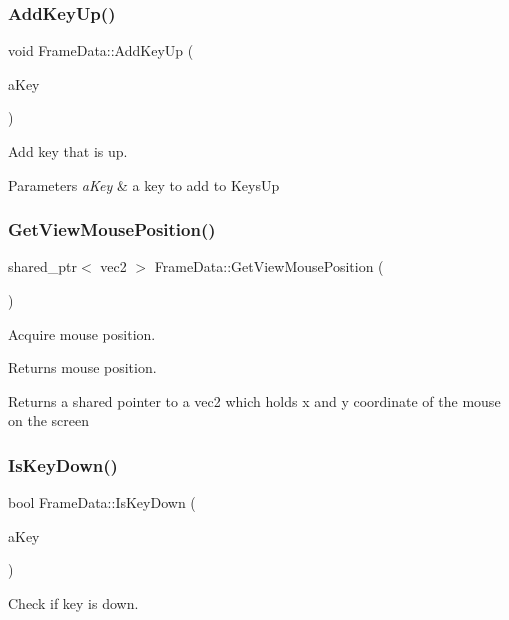 \subsubsection{AddKeyUp()}
{\footnotesize\ttfamily void Frame\+Data\+::\+Add\+Key\+Up (\begin{DoxyParamCaption}\item[{S\+D\+L\+\_\+\+Keycode}]{a\+Key }\end{DoxyParamCaption})}



Add key that is up. 


\begin{DoxyParams}{Parameters}
{\em a\+Key} & a key to add to Keys\+Up \\
\hline
\end{DoxyParams}
\mbox{\label{class_frame_data_a889c857cad48acc4c753032bc521d242}} 
\subsubsection{GetViewMousePosition()}
{\footnotesize\ttfamily shared\+\_\+ptr$<$ vec2 $>$ Frame\+Data\+::\+Get\+View\+Mouse\+Position (\begin{DoxyParamCaption}{ }\end{DoxyParamCaption})}



Acquire mouse position. 

Returns mouse position. \begin{DoxyReturn}{Returns}
a shared pointer to a vec2 which holds x and y coordinate of the mouse on the screen 
\end{DoxyReturn}
\mbox{\label{class_frame_data_af88fb9f4c1769aff9607ae068974131c}} 
\subsubsection{IsKeyDown()}
{\footnotesize\ttfamily bool Frame\+Data\+::\+Is\+Key\+Down (\begin{DoxyParamCaption}\item[{S\+D\+L\+\_\+\+Keycode}]{a\+Key }\end{DoxyParamCaption})}



Check if key is down. 

